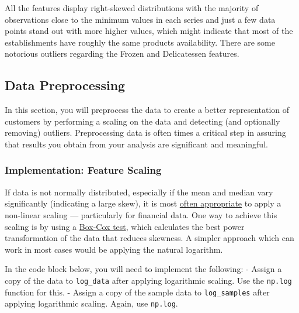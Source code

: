 \documentclass[11pt]{article}
\begin{document}
All the features display right-skewed distributions with the majority of
observations close to the minimum values in each series and just a few
data points stand out with more higher values, which might indicate that
most of the establishments have roughly the same products availability.
There are some notorious outliers regarding the Frozen and Delicatessen
features.

    \subsection{Data Preprocessing}\label{data-preprocessing}

In this section, you will preprocess the data to create a better
representation of customers by performing a scaling on the data and
detecting (and optionally removing) outliers. Preprocessing data is
often times a critical step in assuring that results you obtain from
your analysis are significant and meaningful.

    \subsubsection{Implementation: Feature
Scaling}\label{implementation-feature-scaling}

If data is not normally distributed, especially if the mean and median
vary significantly (indicating a large skew), it is most
\href{http://econbrowser.com/archives/2014/02/use-of-logarithms-in-economics}{often
appropriate} to apply a non-linear scaling --- particularly for
financial data. One way to achieve this scaling is by using a
\href{http://scipy.github.io/devdocs/generated/scipy.stats.boxcox.html}{Box-Cox
test}, which calculates the best power transformation of the data that
reduces skewness. A simpler approach which can work in most cases would
be applying the natural logarithm.

In the code block below, you will need to implement the following: -
Assign a copy of the data to \texttt{log\_data} after applying
logarithmic scaling. Use the \texttt{np.log} function for this. - Assign
a copy of the sample data to \texttt{log\_samples} after applying
logarithmic scaling. Again, use \texttt{np.log}.
\end{document}
